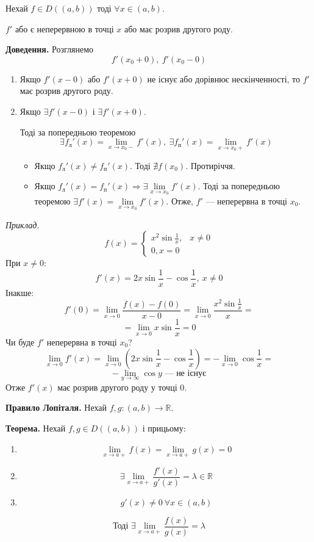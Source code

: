 \documentclass[12pt]{report}
\begin{document}
Нехай $f \in D((a,b))$ тоді $\forall x \in (a,b)$.

$f'$ або є неперервною в точці $x$ або має розрив другого роду.

\textbf{Доведення.} Розглянемо
$$f'(x_0+0),\ f'(x_0-0)$$
\begin{enumerate}
\item Якщо $f'(x - 0)$ або $f'(x + 0)$ не існує або дорівнює нескінченності, то $f'$ має розрив другого роду.

\item Якщо $\exists f'(x - 0)$ і $\exists f'(x + 0)$.

Тоді за попередньою теоремою
$$\exists f_{\textrm{л}}'(x) = \lim_{x\to x_0-}f'(x),\ \exists f_{\textrm{п}}'(x) = \lim_{x\to x_0+}f'(x)$$

\begin{itemize}
\item Якщо $f_{\textrm{л}}'(x) \neq f_{\textrm{п}}'(x)$. Тоді $\nexists f(x_0)$. Протиріччя.
\item Якщо $f_{\textrm{л}}'(x) = f_{\textrm{п}}'(x) \Longrightarrow \exists \lim\limits_{x\to x_0} f'(x)$. Тоді за попередньою теоремою 
$\exists f'(x) = \lim\limits_{x \to x_0}f'(x)$. Отже, $f'$ --- неперервна в точці $x_0$. 
\end{itemize}
\end{enumerate}

\textit{Приклад.} 
$$f(x) = \begin{cases} x^2 \sin \frac{1}{x}, & x \neq 0 \\
				0, x = 0\end{cases}$$
При $x \neq 0$:
$$f'(x) = 2x \sin \frac{1}{x} - \cos \frac{1}{x},\ x\neq 0$$
Інакше:
$$f'(0) = \lim_{x \to 0}\frac{f(x) - f(0)}{x - 0} = \lim_{x\to 0}\frac{x^2 \sin \frac{1}{x}}{x} = $$
$$= \lim_{x\to 0}x \sin \frac{1}{x} = 0$$
Чи буде $f'$ неперервна в точці $x_0$?
$$\lim_{x \to 0}f'(x) = \lim_{x\to 0 }(2x \sin \frac{1}{x} - \cos \frac{1}{x}) = -\lim_{x\to 0}\cos \frac{1}{x} = $$
$$-\lim_{y \to \infty} \cos y \textrm{ --- не існує}$$
Отже $f'(x)$ має розрив другого роду у точці $0$.

\textbf{Правило Лопіталя.} Нехай $f,g : (a,b) \to \mathbb{R}$.

\textbf{Теорема.} Нехай $f,g \in D((a,b))$ і прицьому:
\begin{enumerate}
\item $$\lim_{x\to a+}f(x) = \lim_{x \to a+}g(x) = 0$$ 
\item
$$\exists \lim_{x\to a+}\frac{f'(x)}{g'(x)} = \lambda \in \mathbb{R}$$
\item 
$$g'(x) \neq 0 \ \forall x \in (a,b)$$
\end{enumerate}
$$\textrm{Тоді } \exists \lim_{x\to a+}\frac{f(x)}{g(x)} = \lambda$$
\end{document}
